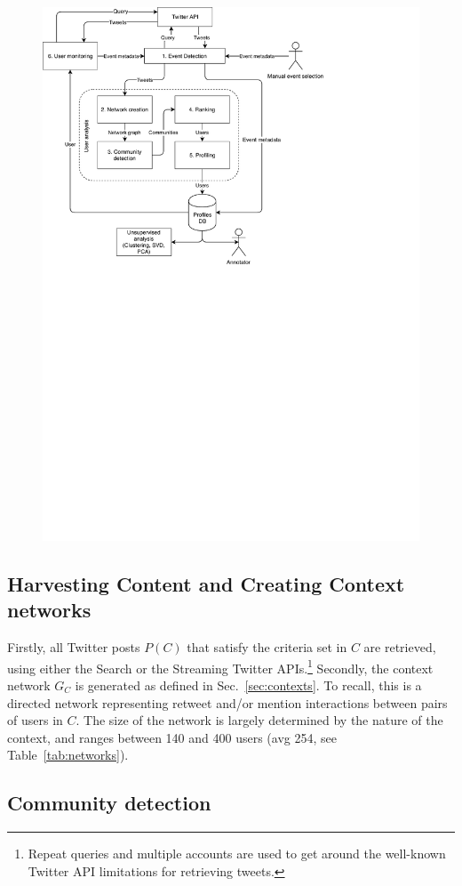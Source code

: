 \documentclass[runningheads]{llncs}
\begin{document}
\begin{figure}
	\centering
	\includegraphics[width=0.7\linewidth]{figures/TwitterFramework}
	\caption{}
	\label{fig:twitterframework}
\end{figure}

\subsection{Harvesting Content and Creating Context networks}  \label{sec:harvesting}

Firstly, all Twitter posts $P(C)$ that satisfy the criteria set in $C$ are retrieved, using either the Search or the Streaming Twitter APIs.\footnote{Repeat queries and multiple accounts are used to get around the well-known Twitter API limitations for retrieving tweets.}
%
Secondly, the context network $G_C$ is generated as defined in Sec.~\ref{sec:contexts}. To recall, this is a directed network representing retweet and/or mention interactions between pairs of users in $C$. 
The size of the network is largely determined by the nature of the context, and  ranges between 140 and 400 users (avg 254, see Table~\ref{tab:networks}).

\subsection{Community detection}  \label{sec:communities}
\end{document}
